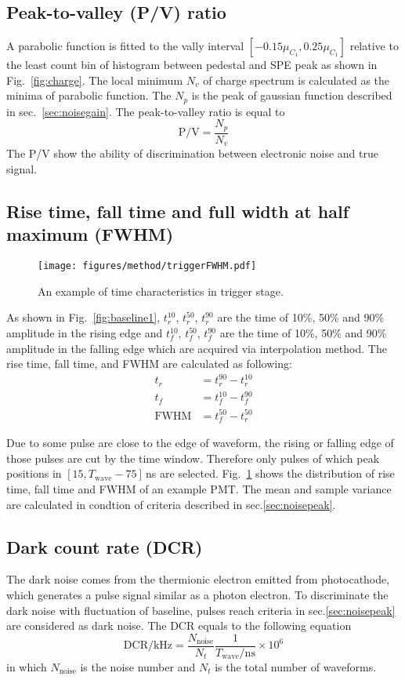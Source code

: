 \subsection{Peak-to-valley (P/V) ratio}
A parabolic function is fitted to the vally interval $[-0.15\mu_{C_1}, 0.25\mu_{C_1}]$ relative to the least count bin of histogram between pedestal and SPE peak as shown in Fig.~\ref{fig:charge}. The local minimum $N_v$ of charge spectrum is calculated as the minima of parabolic function. The $N_p$ is the peak of gaussian function described in sec.~\ref{sec:noisegain}. The peak-to-valley ratio is equal to  
\begin{equation}
    \mathrm{P/V}=\frac{N_p}{N_v}
\end{equation}
The P/V show the ability of discrimination between electronic noise and true signal.
\subsection{Rise time, fall time and full width at half maximum (FWHM)}
\begin{figure}[!htbp]
    \centering
    \texttt{[image: figures/method/triggerFWHM.pdf]}
    \caption{An example of time characteristics in trigger stage.}
    \label{fig:triggerFWHM}
\end{figure}
As shown in Fig.~\ref{fig:baseline1}, $t^{10}_r$, $t^{50}_r$, $t^{90}_r$ are the time of 10\%, 50\% and 90\% amplitude in the rising edge and $t^{10}_f$, $t^{50}_f$, $t^{90}_f$ are the time of 10\%, 50\% and 90\% amplitude in the falling edge which are acquired via interpolation method. The rise time, fall time, and FWHM are calculated as following:
\begin{align}
    t_r &= t^{90}_r - t^{10}_r\\
    t_f &= t^{10}_f - t^{90}_f\\
    \mathrm{FWHM} &= t^{50}_f - t^{50}_r
\end{align}

Due to some pulse are close to the edge of waveform, the rising or falling edge of those pulses are cut by the time window. Therefore only pulses of which peak positions in $[15, T_{\mathrm{wave}}-75]$\,ns are selected. Fig.~\ref{fig:triggerFWHM} shows the distribution of rise time, fall time and FWHM of an example PMT. The mean and sample variance are calculated in condtion of criteria described in sec.\ref{sec:noisepeak}.

\subsection{Dark count rate (DCR)}
The dark noise comes from the thermionic electron emitted from photocathode, which generates a pulse signal similar as a photon electron. To discriminate the dark noise with fluctuation of baseline, pulses reach criteria in sec.\ref{sec:noisepeak} are considered as dark noise. The DCR equals to the following equation
\begin{equation}
    \mathrm{DCR/kHz} = \frac{N_{\mathrm{noise}}}{N_{t}}\frac{1}{T_{\mathrm{wave}}/\mathrm{ns}}\times 10^{6}
\end{equation}
in which $N_{\mathrm{noise}}$ is the noise number and $N_{t}$ is the total number of waveforms.

